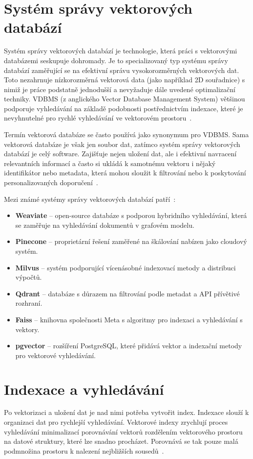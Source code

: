 \section{Systém správy vektorových databází}
Systém správy vektorových databází je technologie, která práci s vektorovými databázemi seskupuje dohromady. Je to specializovaný typ systému správy databází zaměřující se na efektivní správu vysokorozměrných vektorových dat. Toto nezahrnuje nízkorozměrná vektorová data (jako například 2D souřadnice) s nimiž je práce podstatně jednodušší a nevyžaduje dále uvedené optimalizační techniky. VDBMS (z anglického Vector Database Management System) většinou podporuje vyhledávání na základě podobnosti postřednictvím indexace, které je nevyhnutelné pro rychlé vyhledávání ve vektorovém prostoru~\cite{vdbms}.

Termín vektorová databáze se často používá jako synonymum pro VDBMS. Sama vektorová databáze je však jen soubor dat, zatímco systém správy vektorových databází je celý software. Zajišťuje nejen uložení dat, ale i efektivní navracení relevantních informací a často si ukládá k samotnému vektoru i nějaký identifikátor nebo metadata, která mohou sloužit k filtrování nebo k poskytování personalizovaných doporučení~\cite{vdbms}.

Mezi známé systémy správy vektorových databází patří~\cite{survey_vdb}:
\begin{itemize}
    \item \textbf{Weaviate} – open-source databáze s podporou hybridního vyhledávání, která se zaměřuje na vyhledávání dokumentů v grafovém modelu.
    \item \textbf{Pinecone} – proprietární řešení zaměřené na škálování nabízen jako cloudový systém.
    \item \textbf{Milvus} – systém podporující vícenásobné indexovací metody a distribuci výpočtů.
    \item \textbf{Qdrant} – databáze s důrazem na filtrování podle metadat a API přívětivé rozhraní.
    \item \textbf{Faiss} – knihovna společnosti Meta s algoritmy pro indexaci a vyhledávání s vektory.
    \item \textbf{pgvector} – rozšíření PostgreSQL, které přidává vektor a indexační metody pro vektorové vyhledávání.
\end{itemize}


\section{Indexace a vyhledávání}
\label{index}
Po vektorizaci a uložení dat je nad nimi potřeba vytvořit index. Indexace slouží k organizaci dat pro rychlejší vyhledávání. Vektorové indexy zrychlují proces vyhledávání minimalizací porovnávání vektorů rozdělením vektorového prostoru na datové struktury, které lze snadno procházet. Porovnává se tak pouze malá podmnožina prostoru k nalezení nejbližších sousedů~\cite{survey_vdb}.

